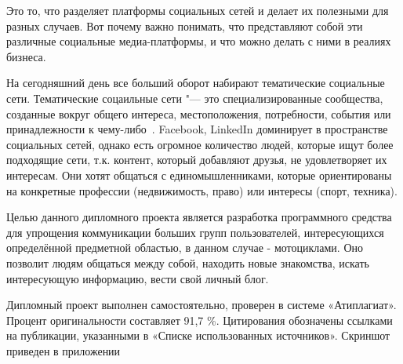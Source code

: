 Это то, что разделяет платформы социальных сетей и делает их
полезными для разных случаев. Вот почему важно понимать, что
представляют собой эти различные социальные медиа-платформы, и что
можно делать с ними в реалиях бизнеса. 

На сегодняшний день все больший оборот набирают тематические социальные сети. Тематические соцаильные сети "--- это специализированные сообщества, созданные вокруг общего интереса, местоположения, потребности, события или принадлежности к чему-либо~\cite{verticalSN}. 
Facebook, LinkedIn доминирует в пространстве социальных сетей, однако есть огромное количество людей, которые ищут более подходящие сети, т.к. контент, который добавляют друзья, не удовлетворяет их интересам.
Они хотят общаться с единомышленниками, которые ориентированы на конкретные профессии (недвижимость, право) или интересы (спорт, техника). 

Целью данного дипломного проекта является разработка программного средства 
для упрощения коммуникации больших групп пользователей,
интересующихся определённой предметной областью, в данном случае -
мотоциклами. Оно позволит людям общаться между собой, находить новые
знакомства, искать интересующую информацию, вести свой личный блог.

Дипломный проект выполнен самостоятельно, проверен в системе «Атиплагиат». Процент оригинальности составляет	91,7 \%. Цитирования обозначены ссылками на публикации, указанными в «Списке
использованных источников». Скриншот приведен в приложении